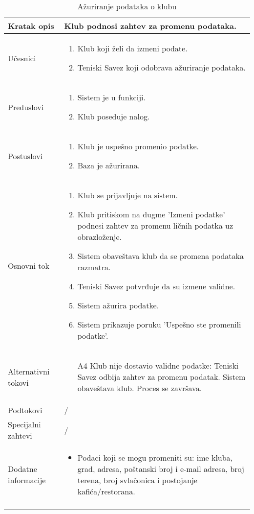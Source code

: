 \documentclass{article}
\begin{document}
\begin{longtable}{| p{} | p{} |} 
\hline
    Kratak opis & Klub podnosi zahtev za promenu podataka.\\ 
\hline    
    Učesnici & \begin{enumerate}
        \item Klub koji želi da izmeni podate.
        \item Teniski Savez koji odobrava ažuriranje podataka. 
    \end{enumerate}
    \\
\hline
   Preduslovi & \begin{enumerate}
       \item Sistem je u funkciji.
       \item Klub poseduje nalog.
   \end{enumerate}\\
\hline  
    Postuslovi & \begin{enumerate}
        \item Klub je uspešno promenio podatke.
        \item Baza je ažurirana.
    \end{enumerate}\\
\hline
    Osnovni tok & \begin{enumerate}
        \item Klub se prijavljuje na sistem.
        \item Klub pritiskom na dugme 'Izmeni podatke' podnesi zahtev za promenu ličnih podatka uz obrazloženje.
        \item Sistem obaveštava klub da se promena podataka razmatra.
        \item Teniski Savez potvrđuje da su izmene validne.
        \item Sistem ažurira podatke.
        \item Sistem prikazuje poruku 'Uspešno ste promenili podatke'.
    \end{enumerate}\\
\hline
    Alternativni tokovi & \begin{itemize}
        \item[A4] Klub nije dostavio validne podatke: Teniski Savez odbija zahtev za promenu podatak. Sistem obaveštava klub. Proces se završava.
    \end{itemize}\\
\hline
    Podtokovi & /\\
\hline
    Specijalni zahtevi & /\\
\hline
    Dodatne informacije & \begin{itemize}
        \item Podaci koji se mogu promeniti su: ime kluba, grad, adresa, poštanski broj i e-mail adresa, broj terena, broj svlačonica i postojanje kafića/restorana.
    \end{itemize} \\
\hline
\caption{Ažuriranje podataka o klubu}
\end{longtable}
\end{document}
